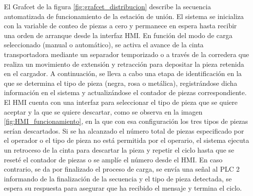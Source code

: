 El Grafcet de la figura \ref{fig:grafcet_distribucion} describe la secuencia automatizada de funcionamiento de la estación de unión. El sistema se inicializa con la variable de conteo de piezas a cero y permanece en espera hasta recibir una orden de arranque desde la interfaz HMI. En función del modo de carga seleccionado (manual o automático), se activa el avance de la cinta transportadora mediante un separador temporizado o a través de la corredera que realiza un movimiento de extensión y retracción para depositar la pieza retenida en el cargador. A continuación, se lleva a cabo una etapa de identificación en la que se determina el tipo de pieza (negra, rosa o metálica), registrándose dicha información en el sistema y actualizándose el contador de piezas correspondiente. El HMI cuenta con una interfaz para seleccionar el tipo de pieza que se quiere aceptar y la que se quiere descartar, como se observa en la imagen \ref{fig:HMI_funcionamiento}, en la que con esa configuración los tres tipos de piezas serían descartados. Si se ha alcanzado el número total de piezas especificado por el operador o el tipo de pieza no está permitida por el operario, el sistema ejecuta un retroceso de la cinta para descartar la pieza y repetir el ciclo hasta que se reseté el contador de piezas o se amplíe el número desde el HMI. En caso contrario, se da por finalizado el proceso de carga, se envía una señal al PLC 2 informando de la finalización de la secuencia y el tipo de pieza detectada, se espera su respuesta para asegurar que ha recibido el mensaje y termina el ciclo. 

\clearpage

